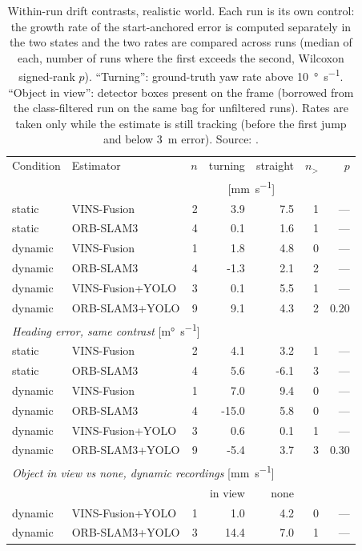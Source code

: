 \begin{table}[htbp]
\centering
\small
\caption[Within-run drift contrasts, realistic world.]{Within-run drift contrasts, realistic world. Each run is its own control: the growth rate of the start-anchored error is computed separately in the two states and the two rates are compared across runs (median of each, number of runs where the first exceeds the second, Wilcoxon signed-rank $p$). ``Turning'': ground-truth yaw rate above \SI{10}{\degree\per\second}. ``Object in view'': detector boxes present on the frame (borrowed from the class-filtered run on the same bag for unfiltered runs). Rates are taken only while the estimate is still tracking (before the first jump and below \SI{3}{\metre} error). Source: .}
\label{tab:insight-contrast-realistic}
\begin{tabular}{llrrrrr}
\toprule
Condition & Estimator & $n$ & turning & straight & $n_{>}$ & $p$ \\
 & & & \multicolumn{2}{c}{[\si{\milli\metre\per\second}]} & & \\
\midrule
static & VINS-Fusion & 2 & 3.9 & 7.5 & 1 & --- \\
static & ORB-SLAM3 & 4 & 0.1 & 1.6 & 1 & --- \\
dynamic & VINS-Fusion & 1 & 1.8 & 4.8 & 0 & --- \\
dynamic & ORB-SLAM3 & 4 & -1.3 & 2.1 & 2 & --- \\
dynamic & VINS-Fusion+YOLO & 3 & 0.1 & 5.5 & 1 & --- \\
dynamic & ORB-SLAM3+YOLO & 9 & 9.1 & 4.3 & 2 & 0.20 \\
\midrule
\multicolumn{7}{l}{\emph{Heading error, same contrast} [\si{\milli\degree\per\second}]} \\
static & VINS-Fusion & 2 & 4.1 & 3.2 & 1 & --- \\
static & ORB-SLAM3 & 4 & 5.6 & -6.1 & 3 & --- \\
dynamic & VINS-Fusion & 1 & 7.0 & 9.4 & 0 & --- \\
dynamic & ORB-SLAM3 & 4 & -15.0 & 5.8 & 0 & --- \\
dynamic & VINS-Fusion+YOLO & 3 & 0.6 & 0.1 & 1 & --- \\
dynamic & ORB-SLAM3+YOLO & 9 & -5.4 & 3.7 & 3 & 0.30 \\
\midrule
\multicolumn{7}{l}{\emph{Object in view vs none, dynamic recordings} [\si{\milli\metre\per\second}]} \\
 & & & in view & none & & \\
dynamic & VINS-Fusion+YOLO & 1 & 1.0 & 4.2 & 0 & --- \\
dynamic & ORB-SLAM3+YOLO & 3 & 14.4 & 7.0 & 1 & --- \\
\bottomrule
\end{tabular}
\end{table}
